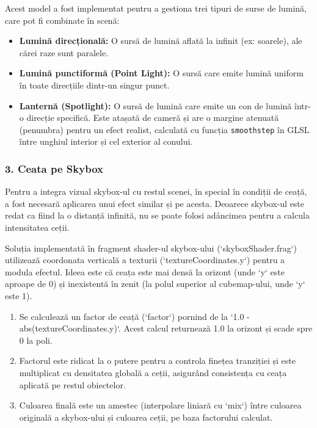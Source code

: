 \documentclass[11pt,a4paper]{article}
\begin{document}
Acest model a fost implementat pentru a gestiona trei tipuri de surse de lumină, care pot fi combinate în scenă:
\begin{itemize}
    \item \textbf{Lumină direcțională:} O sursă de lumină aflată la infinit (ex: soarele), ale cărei raze sunt paralele.
    \item \textbf{Lumină punctiformă (Point Light):} O sursă care emite lumină uniform în toate direcțiile dintr-un singur punct.
    \item \textbf{Lanternă (Spotlight):} O sursă de lumină care emite un con de lumină într-o direcție specifică. Este atașată de cameră și are o margine atenuată (penumbra) pentru un efect realist, calculată cu funcția \texttt{smoothstep} în GLSL între unghiul interior și cel exterior al conului.
\end{itemize}

\subsubsection{3. Ceata pe Skybox}
Pentru a integra vizual skybox-ul cu restul scenei, în special în condiții de ceață, a fost necesară aplicarea unui efect similar și pe acesta. Deoarece skybox-ul este redat ca fiind la o distanță infinită, nu se poate folosi adâncimea pentru a calcula intensitatea ceții.

Soluția implementată în fragment shader-ul skybox-ului (`skyboxShader.frag`) utilizează coordonata verticală a texturii (`textureCoordinates.y`) pentru a modula efectul. Ideea este că ceața este mai densă la orizont (unde `y` este aproape de 0) și inexistentă în zenit (la polul superior al cubemap-ului, unde `y` este 1).

\begin{enumerate}
    \item Se calculează un factor de ceață (`factor`) pornind de la `1.0 - abs(textureCoordinates.y)`. Acest calcul returnează 1.0 la orizont și scade spre 0 la poli.
    \item Factorul este ridicat la o putere pentru a controla finețea tranziției și este multiplicat cu densitatea globală a ceții, asigurând consistența cu ceața aplicată pe restul obiectelor.
    \item Culoarea finală este un amestec (interpolare liniară cu `mix`) între culoarea originală a skybox-ului și culoarea ceții, pe baza factorului calculat.
\end{enumerate}
\end{document}

